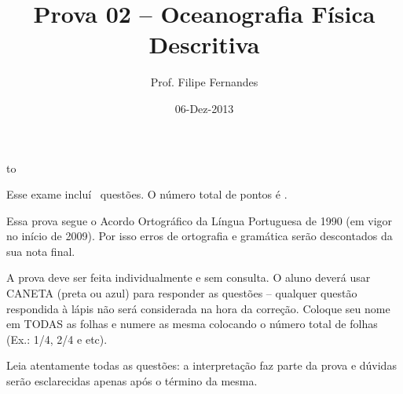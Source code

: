 \documentclass[letterpaper,portuguese,12pt,pdftex]{exam}
\title{Prova 02 -- Oceanografia Física Descritiva}
\author{Prof. Filipe Fernandes}
\date{06-Dez-2013}
\begin{document}
\maketitle
\doublespacing

\vspace{1cm}
\hbox to \textwidth{Nome e número de matrícula:\enspace\hrulefill}
\vspace{1cm}

\begin{minipage}{.8\textwidth}
Esse exame incluí \numquestions\ questões. O número total de pontos é \numpoints.
\vspace{1cm}

Essa prova segue o Acordo Ortográfico da Língua Portuguesa de 1990 (em vigor no
início de 2009).  Por isso erros de ortografia e gramática serão descontados da
sua nota final.

A prova deve ser feita individualmente e sem consulta.  O aluno deverá usar
CANETA (preta ou azul) para responder as questões – qualquer questão respondida
à lápis não será considerada na hora da correção.  Coloque seu nome em TODAS as
folhas e numere as mesma colocando o número total de folhas (Ex.: 1/4, 2/4 e
etc).


\vspace{1cm}

Leia atentamente todas as questões: a interpretação faz parte da prova e dúvidas
serão esclarecidas apenas após o término da mesma.


\end{minipage}

\clearpage
\end{document}

